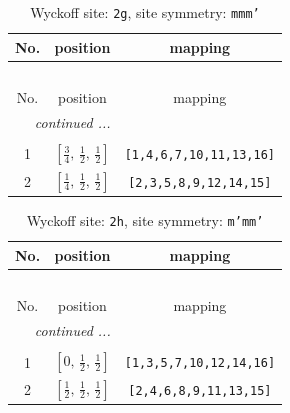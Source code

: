 \documentclass[fleqn,8pt]{jsarticle}
\begin{document}
\begin{longtable}{ccc}
\caption{Wyckoff site: {\tt 2g}, site symmetry: {\tt mmm'}}
 \\
 \hline \hline
No. & position & mapping \\ \hline \endfirsthead

\multicolumn{2}{l}{\tablename\ \thetable{}} \\
 \hline \hline
No. & position & mapping \\ \hline \endhead

 \hline \hline
\multicolumn{2}{r}{\footnotesize\it continued ...} \\ \endfoot

 \hline \hline
\multicolumn{2}{r}{} \\ \endlastfoot

1 & $\left[ \frac{3}{4},\, \frac{1}{2},\, \frac{1}{2} \right]$ & {\tt [1,4,6,7,10,11,13,16]} \\ \hline
2 & $\left[ \frac{1}{4},\, \frac{1}{2},\, \frac{1}{2} \right]$ & {\tt [2,3,5,8,9,12,14,15]} \\
\end{longtable}
\renewcommand{\arraystretch}{1.2}
\begin{longtable}{ccc}
\caption{Wyckoff site: {\tt 2h}, site symmetry: {\tt m'mm'}}
 \\
 \hline \hline
No. & position & mapping \\ \hline \endfirsthead

\multicolumn{2}{l}{\tablename\ \thetable{}} \\
 \hline \hline
No. & position & mapping \\ \hline \endhead

 \hline \hline
\multicolumn{2}{r}{\footnotesize\it continued ...} \\ \endfoot

 \hline \hline
\multicolumn{2}{r}{} \\ \endlastfoot

1 & $\left[ 0,\, \frac{1}{2},\, \frac{1}{2} \right]$ & {\tt [1,3,5,7,10,12,14,16]} \\ \hline
2 & $\left[ \frac{1}{2},\, \frac{1}{2},\, \frac{1}{2} \right]$ & {\tt [2,4,6,8,9,11,13,15]} \\
\end{longtable}
\renewcommand{\arraystretch}{1.2}
\end{document}
